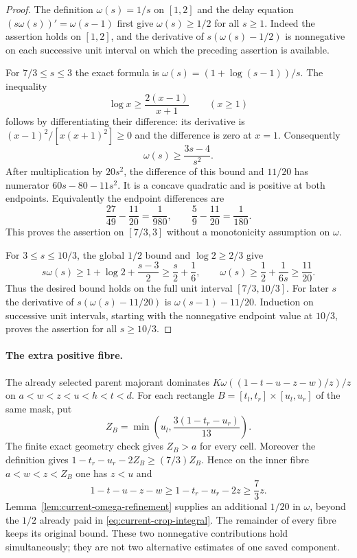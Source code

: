 \begin{proof}
The definition $\omega(s)=1/s$ on $[1,2]$ and the delay equation
$(s\omega(s))'=\omega(s-1)$ first give $\omega(s)\ge1/2$ for all
$s\ge1$.  Indeed the assertion holds on $[1,2]$, and the derivative
of $s(\omega(s)-1/2)$ is nonnegative on each successive unit interval
on which the preceding assertion is available.

For $7/3\le s\le3$ the exact formula is
$\omega(s)=(1+\log(s-1))/s$.  The inequality
\[
 \log x\ge\frac{2(x-1)}{x+1}\qquad(x\ge1)
\]
follows by differentiating their difference: its derivative is
$(x-1)^2/[x(x+1)^2]\ge0$ and the difference is zero at $x=1$.
Consequently
\[
 \omega(s)\ge\frac{3s-4}{s^2}.
\]
After multiplication by $20s^2$, the difference of this bound and
$11/20$ has numerator $60s-80-11s^2$.  It is a concave quadratic
and is positive at both endpoints.  Equivalently the endpoint
differences are
\[
 \frac{27}{49}-\frac{11}{20}=\frac1{980},
 \qquad
 \frac59-\frac{11}{20}=\frac1{180}.
\]
This proves the assertion on $[7/3,3]$ without a monotonicity
assumption on $\omega$.

For $3\le s\le10/3$, the global $1/2$ bound and $\log2\ge2/3$
give
\[
 s\omega(s)\ge1+\log2+\frac{s-3}{2}
             \ge\frac{s}{2}+\frac16,
 \qquad
 \omega(s)\ge\frac12+\frac1{6s}\ge\frac{11}{20}.
\]
Thus the desired bound holds on the full unit interval $[7/3,10/3]$.
For later $s$ the derivative of $s(\omega(s)-11/20)$ is
$\omega(s-1)-11/20$.  Induction on successive unit intervals,
starting with the nonnegative endpoint value at $10/3$, proves
the assertion for all $s\ge10/3$.
\end{proof}

\paragraph{The extra positive fibre.}
The already selected parent majorant dominates
$K\omega((1-t-u-z-w)/z)/z$ on $a<w<z<u<h<t<d$.
For each rectangle $B=[t_l,t_r]\times[u_l,u_r]$ of the same mask,
put
\begin{equation}
 Z_B=\min\left(u_l,\frac{3(1-t_r-u_r)}{13}\right).
 \label{eq:current-Z}
\end{equation}
The finite exact geometry check gives $Z_B>a$ for every cell.
Moreover the definition gives
$1-t_r-u_r-2Z_B\ge(7/3)Z_B$.  Hence on the inner fibre
$a<w<z<Z_B$ one has $z<u$ and
\[
 1-t-u-z-w\ge1-t_r-u_r-2z\ge\frac73z.
\]
Lemma~\ref{lem:current-omega-refinement} supplies an additional
$1/20$ in $\omega$, beyond the $1/2$ already paid in
\eqref{eq:current-crop-integral}.  The remainder of every fibre
keeps its original bound.  These two nonnegative contributions
hold simultaneously; they are not two alternative estimates of
one saved component.

